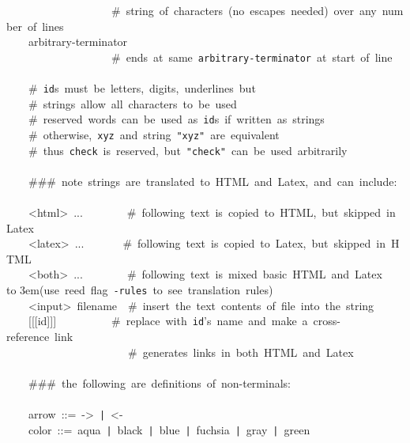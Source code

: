 {\hbox{}~~~~~~~~~~~~~~~~~~~{\rm \#~string~of~characters~(no~escapes~needed)~over~any~number~of~lines}\\
\hbox{}~~~~arbitrary-terminator~\\
\hbox{}~~~~~~~~~~~~~~~~~~~{\rm \#~ends~at~same~\texttt{arbitrary-terminator}~at~start~of~line}\\
\hbox{}\\
\hbox{}~~~~{\rm \#~\texttt{id}s~must~be~letters,~digits,~underlines~but}\\
\hbox{}~~~~{\rm \#~strings~allow~all~characters~to~be~used}\\
\hbox{}~~~~{\rm \#~reserved~words~can~be~used~as~\texttt{id}s~if~written~as~strings}\\
\hbox{}~~~~{\rm \#~otherwise,~\texttt{xyz}~and~string~\texttt{"xyz"}~are~equivalent}\\
\hbox{}~~~~{\rm \#~thus~\texttt{check}~is~reserved,~but~\texttt{"check"}~can~be~used~arbitrarily}\\
\hbox{}\\
\hbox{}~~~~{\rm \#\#\#~note~strings~are~translated~to~HTML~and~Latex,~and~can~include:}\\
\hbox{}\\
\hbox{}~~~~<html>~...~~~~~~~~{\rm \#~following~text~is~copied~to~HTML,~but~skipped~in~Latex}\\
\hbox{}~~~~<latex>~...~~~~~~~{\rm \#~following~text~is~copied~to~Latex,~but~skipped~in~HTML}\\
\hbox{}~~~~<both>~...~~~~~~~~{\rm \#~following~text~is~mixed~basic~HTML~and~Latex~}\\
\hbox to 3em{}{\rm (use~reed~flag~\texttt{-rules}~to~see~translation~rules)}\\
\hbox{}~~~~<input>~filename~~{\rm \#~insert~the~text~contents~of~file~into~the~string}\\
\hbox{}~~~~[[[id]]]~~~~~~~~~~{\rm \#~replace~with~\texttt{id}'s~name~and~make~a~cross-reference~link~}\\
\hbox{}~~~~~~~~~~~~~~~~~~~~~~{\rm \#~generates~links~in~both~HTML~and~Latex}\\
\hbox{}\\
\hbox{}~~~~{\rm \#\#\#~the~following~are~definitions~of~non-terminals:}\\
\hbox{}\\
\hbox{}~~~~arrow~::=~->~\texttt{|}~<-~\\
\hbox{}~~~~color~::=~aqua~\texttt{|}~black~\texttt{|}~blue~\texttt{|}~fuchsia~\texttt{|}~gray~\texttt{|}~green\\
}

